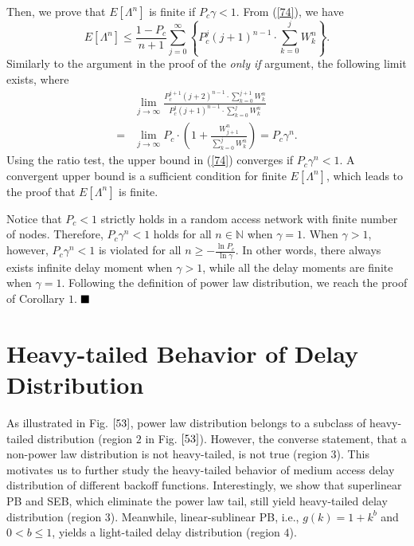 \documentclass[journal]{IEEEtran}
\begin{document}
Then, we prove that $E\left[\Lambda^n\right]$ is finite if $P_c\gamma<1$. From (\ref{74}), we have
\begin{equation}
E[\Lambda^n]\leq\frac{1-P_c}{n+1}\sum_{j=0}^{\infty}\left\{P_c^j\left(j+1\right)^{n-1}\cdot \sum_{k=0}^{j}W_k^{n}\right\}.
\end{equation}
Similarly to the argument in the proof of the \emph{only if} argument, the following limit exists, where
\begin{equation}
\begin{aligned}
&\lim_{j\rightarrow \infty} \frac{P_c^{j+1}\left(j+2\right)^{n-1}\cdot\sum_{k=0}^{j+1}W_k^n}{P_c^j\left(j+1\right)^{n-1}\cdot\sum_{k=0}^{j}W_k^n}\\
=&\lim_{j\rightarrow \infty} P_c\cdot \left(1+\frac{W_{j+1}^{n}}{\sum_{k=0}^{j}W_k^n}\right) = P_c\gamma^n.
\end{aligned}
\end{equation}
Using the ratio test, the upper bound in (\ref{74}) converges if $P_c\gamma^n<1$. A convergent upper bound is a sufficient condition for finite $E[\Lambda^n]$, which leads to the proof that $E\left[\Lambda^n\right]$ is finite.

Notice that $P_c<1$ strictly holds in a random access network with finite number of nodes. Therefore, $P_c \gamma^n <1$ holds for all $n\in \mathbb{N}$ when $\gamma=1$. When $\gamma>1$, however, $P_c \gamma^n <1$ is violated for all $n \geq -\frac{\ln P_c}{\ln \gamma}$. In other words, there always exists infinite delay moment when $\gamma>1$, while all the delay moments are finite when $\gamma=1$. Following the definition of power law distribution, we reach the proof of Corollary $1$. $\hfill \blacksquare$

\section{Heavy-tailed Behavior of Delay Distribution}
As illustrated in Fig. $\ref{53}$, power law distribution belongs to a subclass of heavy-tailed distribution (region $2$ in Fig. $\ref{53}$). However, the converse statement, that a non-power law distribution is not heavy-tailed, is not true (region $3$). This motivates us to further study the heavy-tailed behavior of medium access delay distribution of different backoff functions. Interestingly, we show that superlinear PB and SEB, which eliminate the power law tail, still yield heavy-tailed delay distribution (region $3$). Meanwhile, linear-sublinear PB, i.e., $g(k)=1+k^b$ and $0<b\leq1$, yields a light-tailed delay distribution (region $4$).
\end{document}
